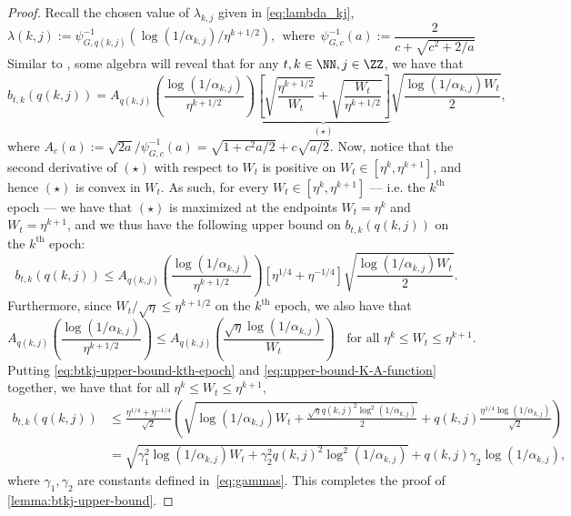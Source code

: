     \begin{proof}
      Recall the chosen value of $\lambda_{k,j}$ given in \eqref{eq:lambda_kj},
      \begin{equation}
    \lambda(k,j) := \psi^{-1}_{G, q(k,j)}( \log(1/\alpha_{k,j}) / \eta^{k+1/2}),~~\text{where}~~\psi_{G,c}^{-1}(a) := \frac{2}{c + \sqrt{c^2 + 2/a}}
      \end{equation}
      Similar to \citet[Eq. (39)]{howard2018uniform}, some algebra will reveal that for any $t, k \in \NN, j \in \ZZ$, we have that
      \begin{equation*}
        b_{t,k}(q(k,j)) = A_{q(k,j)}\left ( \frac{\log(1/\alpha_{k,j})}{\eta^{k+1/2}} \right ) \underbrace{\left [ \sqrt{\frac{\eta^{k+1/2}}{ W_t}} + \sqrt{\frac{W_t}{\eta^{k+1/2}}} \right ]}_{(\star)} \sqrt{\frac{\log(1/\alpha_{k,j})W_t}{2}},
      \end{equation*}
      where $A_{c}(a) := \sqrt{2a} / \psi_{G,c}^{-1}(a) = \sqrt{1 + c^2a/2} + c\sqrt{a/2}$. 
      Now, notice that the second derivative of $(\star)$ with respect to $W_t$ is positive on $W_t \in [\eta^k, \eta^{k+1}]$, and hence $(\star)$ is convex in $W_t$. As such, for every $W_t \in [\eta^k, \eta^{k+1}]$ --- i.e. the $k^\mathrm{th}$ epoch --- we have that $(\star)$ is maximized at the endpoints $W_t = \eta^k$ and $W_t = \eta^{k+1}$, and we thus have the following upper bound on $b_{t,k}(q(k,j))$ on the $k^\mathrm{th}$ epoch:
      \begin{equation}\label{eq:btkj-upper-bound-kth-epoch}
        b_{t,k}(q(k,j)) \leq A_{q(k,j)}\left ( \frac{\log(1/\alpha_{k,j})}{\eta^{k+1/2}} \right ) \left [ \eta^{1/4} + \eta^{-1/4} \right ] \sqrt{\frac{\log(1/\alpha_{k,j})W_t}{2}}.
      \end{equation}
      Furthermore, since $W_t / \sqrt{\eta} \leq \eta^{k+1/2}$ on the $k^\mathrm{th}$ epoch, we also have that
      \begin{equation}\label{eq:upper-bound-K-A-function}
        A_{q(k,j)} \left ( \frac{\log(1/\alpha_{k,j})}{\eta^{k+1/2}} \right ) \leq A_{q(k,j)} \left ( \frac{\sqrt{\eta}\log(1/\alpha_{k,j})}{W_t} \right )~~~~\text{for all } \eta^k \leq W_t \leq \eta^{k+1}.
      \end{equation}
      Putting \eqref{eq:btkj-upper-bound-kth-epoch} and \eqref{eq:upper-bound-K-A-function} together, we have that for all $\eta^k \leq W_t \leq \eta^{k+1}$, 
      \begin{align}
        b_{t,k}(q(k,j)) &\leq \frac{\eta^{1/4} + \eta^{-1/4}}{\sqrt{2}} \left ( \sqrt{\log(1/\alpha_{k,j}) W_t + \frac{\sqrt{\eta}q(k,j)^2 \log^2(1/\alpha_{k,j})}{2}} + q(k,j)\frac{\eta^{1/4}\log(1/\alpha_{k,j})}{\sqrt{2}} \right )\nonumber \\
                        &= \sqrt{\gamma_1^2 \log(1/\alpha_{k,j}) W_t + \gamma_2^2 q(k,j)^2 \log^2(1/\alpha_{k,j})} + q(k,j)\gamma_2 \log(1/\alpha_{k,j}),
      \end{align}
      where $\gamma_1, \gamma_2$ are constants defined in~\eqref{eq:gammas}.
      This completes the proof of \cref{lemma:btkj-upper-bound}.
    \end{proof}


